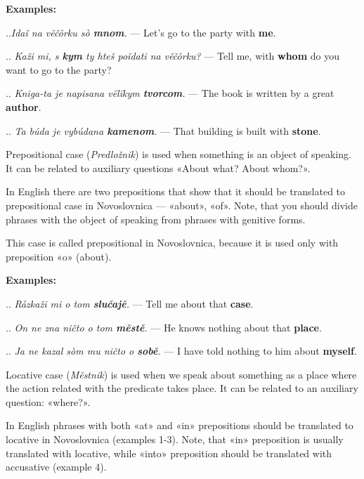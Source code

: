 \textbf{Examples:}

..\textit{Idaǐ na věčôrku sò \textbf{mnom}.} — Let's go to the party with \textbf{me}.

.. \textit{Kaži mi, s \textbf{kym} ty hteš poǐdati na věčôrku?} — Tell me, with \textbf{whom} do you want to go to the party?

.. \textit{Kniga-ta je napisana vëlïkym \textbf{tvorcom}.} — The book is written by a great \textbf{author}.

.. \textit{Ta búda je vybúdana \textbf{kamenom}.} — That building is built with \textbf{stone}.

Prepositional case (\textit{Predložnik}) is used when something is an object of speaking. It can be related to auxiliary questions «About what? About whom?».

In English there are two prepositions that show that it should be translated to prepositional case in Novoslovnica — «about», «of». Note, that you should divide phrases with the object of speaking from phrases with genitive forms.

This case is called prepositional in Novoslovnica, because it is used only with preposition «o» (about).

\textbf{Examples:}

.. \textit{Råzkaži mi o tom \textbf{slučajě}.} — Tell me about that \textbf{case}.

.. \textit{On ne zna ničto o tom \textbf{městě}.} — He knows nothing about that \textbf{place}.

.. \textit{Ja ne kazal sòm mu ničto o \textbf{sobě}.} — I have told nothing to him about \textbf{myself}.

Locative case (\textit{Městnik}) is used when we speak about something as a place where the action related with the predicate takes place. It can be related to an auxiliary question: «where?».

In English phrases with both «at» and «in» prepositions should be translated to locative in Novoslovnica (examples 1-3). Note, that «in» preposition is usually translated with locative, while «into» preposition should be translated with accusative (example 4).

